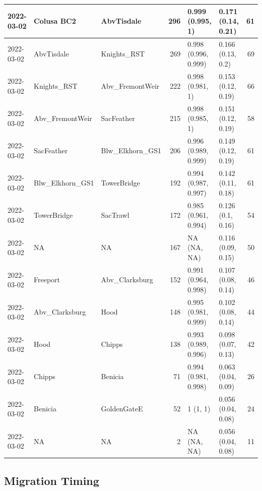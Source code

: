 \documentclass[
]{book}
\theoremstyle{definition}
\theoremstyle{definition}
\theoremstyle{definition}
\theoremstyle{definition}
\theoremstyle{remark}
\begin{document}
\begin{table}
\begin{tabular}[t]{lllrllr}
\hline
2022-03-02 & Colusa BC2 & AbvTisdale & 296 & 0.999 (0.995, 1) & 0.171 (0.14, 0.21) & 61\\
\hline
2022-03-02 & AbvTisdale & Knights\_RST & 269 & 0.998 (0.996, 0.999) & 0.166 (0.13, 0.2) & 69\\
\hline
2022-03-02 & Knights\_RST & Abv\_FremontWeir & 222 & 0.998 (0.981, 1) & 0.153 (0.12, 0.19) & 66\\
\hline
2022-03-02 & Abv\_FremontWeir & SacFeather & 215 & 0.998 (0.985, 1) & 0.151 (0.12, 0.19) & 58\\
\hline
2022-03-02 & SacFeather & Blw\_Elkhorn\_GS1 & 206 & 0.996 (0.989, 0.999) & 0.149 (0.12, 0.19) & 61\\
\hline
2022-03-02 & Blw\_Elkhorn\_GS1 & TowerBridge & 192 & 0.994 (0.987, 0.997) & 0.142 (0.11, 0.18) & 61\\
\hline
2022-03-02 & TowerBridge & SacTrawl & 172 & 0.985 (0.961, 0.994) & 0.126 (0.1, 0.16) & 54\\
\hline
2022-03-02 & NA & NA & 167 & NA (NA, NA) & 0.116 (0.09, 0.15) & 50\\
\hline
2022-03-02 & Freeport & Abv\_Clarksburg & 152 & 0.991 (0.964, 0.998) & 0.107 (0.08, 0.14) & 46\\
\hline
2022-03-02 & Abv\_Clarksburg & Hood & 148 & 0.995 (0.981, 0.999) & 0.102 (0.08, 0.14) & 44\\
\hline
2022-03-02 & Hood & Chipps & 138 & 0.993 (0.989, 0.996) & 0.098 (0.07, 0.13) & 42\\
\hline
2022-03-02 & Chipps & Benicia & 71 & 0.994 (0.981, 0.998) & 0.063 (0.04, 0.09) & 26\\
\hline
2022-03-02 & Benicia & GoldenGateE & 52 & 1 (1, 1) & 0.056 (0.04, 0.08) & 24\\
\hline
2022-03-02 & NA & NA & 2 & NA (NA, NA) & 0.056 (0.04, 0.08) & 11\\
\hline
\end{tabular}
\end{table}

\hypertarget{migration-timing}{%
\subsection{Migration Timing}\label{migration-timing}}
\end{document}
